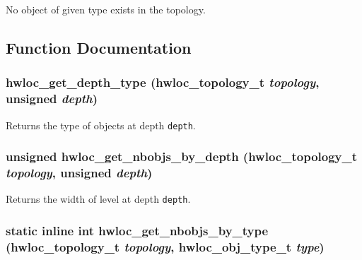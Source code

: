 No object of given type exists in the topology. 



\subsection{Function Documentation}
\hypertarget{group__hwlocality__information_g8cc04ad9eb03b0b74d420adf8cc11ad2}{
\subsubsection[{hwloc\_\-get\_\-depth\_\-type}]{ hwloc\_\-get\_\-depth\_\-type ({\bf hwloc\_\-topology\_\-t} {\em topology}, \/  unsigned {\em depth})}}
\label{group__hwlocality__information_g8cc04ad9eb03b0b74d420adf8cc11ad2}


Returns the type of objects at depth {\tt depth}. 

\hypertarget{group__hwlocality__information_gb17065e3d53455973844568d9f21c72c}{
\subsubsection[{hwloc\_\-get\_\-nbobjs\_\-by\_\-depth}]{\setlength{\rightskip}{0pt plus 5cm}unsigned hwloc\_\-get\_\-nbobjs\_\-by\_\-depth ({\bf hwloc\_\-topology\_\-t} {\em topology}, \/  unsigned {\em depth})}}
\label{group__hwlocality__information_gb17065e3d53455973844568d9f21c72c}


Returns the width of level at depth {\tt depth}. 

\hypertarget{group__hwlocality__information_gd86a90c0d3501d90410fb1a4eb36f5d0}{
\subsubsection[{hwloc\_\-get\_\-nbobjs\_\-by\_\-type}]{\setlength{\rightskip}{0pt plus 5cm}static inline int hwloc\_\-get\_\-nbobjs\_\-by\_\-type ({\bf hwloc\_\-topology\_\-t} {\em topology}, \/  {\bf hwloc\_\-obj\_\-type\_\-t} {\em type})}}
\label{group__hwlocality__information_gd86a90c0d3501d90410fb1a4eb36f5d0}


